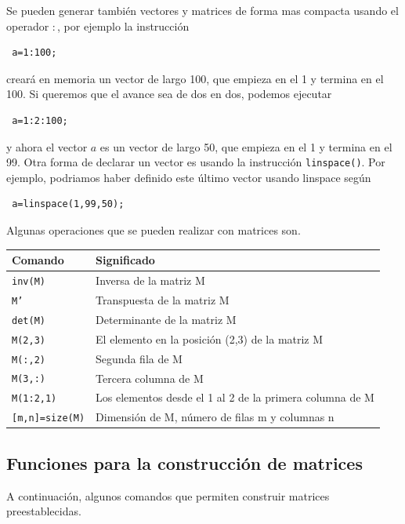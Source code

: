 \documentclass[11pt,legalpaper]{article}
\begin{document}
Se pueden generar tambi\'en vectores y matrices de forma mas compacta usando el operador $:$, por ejemplo 
la instrucci\'on 
\begin{verbatim}
 a=1:100;
\end{verbatim}
crear\'a en memoria un vector de largo 100, que empieza en el 1 y termina en el 100. Si queremos que el avance sea de 
dos en dos, podemos ejecutar
\begin{verbatim}
 a=1:2:100;
\end{verbatim}
y ahora el vector $a$ es un vector de largo 50, que empieza en el 1 y termina en el 99. Otra forma de declarar un vector 
es usando la instrucci\'on \texttt{linspace()}. Por ejemplo, podriamos haber definido este \'ultimo vector usando 
linspace seg\'un
\begin{verbatim}
 a=linspace(1,99,50);
\end{verbatim}

Algunas operaciones que se pueden realizar con matrices son.

\begin{center}
\begin{tabular}{l|l}
\hline
Comando		& Significado \\
\hline
\texttt{inv(M)}	&  	Inversa de la matriz M		\\
\texttt{M'}		& 	Transpuesta de la matriz M	\\
\texttt{det(M)}	&	Determinante de la matriz M	\\
\texttt{M(2,3)}	&	El elemento en la posici\'on (2,3) de la matriz M\\
\texttt{M(:,2)}	&	Segunda fila de M\\
\texttt{M(3,:)}	&	Tercera columna de M\\
\texttt{M(1:2,1)}&	Los elementos desde el 1 al 2 de la primera columna de M\\
\texttt{[m,n]=size(M)}& Dimensi\'on de M, n\'umero de filas m y columnas n
\end{tabular}
\end{center}

\subsection{Funciones para la construcci\'on de matrices}

A continuaci\'on, algunos comandos que permiten construir matrices preestablecidas.
\end{document}
